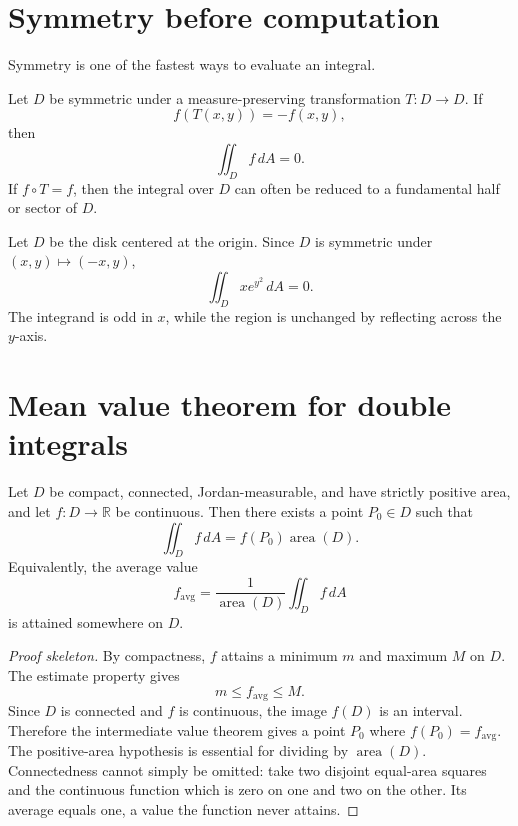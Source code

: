 \section{Symmetry before computation}

Symmetry is one of the fastest ways to evaluate an integral.

\begin{proposition}
Let \(D\) be symmetric under a measure-preserving transformation \(T:D\to D\).  If
\[
  f(T(x,y))=-f(x,y),
\]
then
\[
  \iint_D f\,dA=0.
\]
If \(f\circ T=f\), then the integral over \(D\) can often be reduced to a fundamental half or sector of \(D\).
\end{proposition}

\begin{example}
Let \(D\) be the disk centered at the origin.  Since \(D\) is symmetric under \((x,y)\mapsto(-x,y)\),
\[
  \iint_D x e^{y^2}\,dA=0.
\]
The integrand is odd in \(x\), while the region is unchanged by reflecting across the \(y\)-axis.
\end{example}

\section{Mean value theorem for double integrals}

\begin{theorem}
Let \(D\) be compact, connected, Jordan-measurable, and have strictly positive area, and let \(f:D\to\mathbb R\) be continuous.  Then there exists a point \(P_0\in D\) such that
\[
  \iint_D f\,dA=f(P_0)\operatorname{area}(D).
\]
Equivalently, the average value
\[
  f_{\mathrm{avg}}=\frac{1}{\operatorname{area}(D)}\iint_D f\,dA
\]
is attained somewhere on \(D\).
\end{theorem}

\begin{proof}[Proof skeleton]
By compactness, \(f\) attains a minimum \(m\) and maximum \(M\) on \(D\).  The estimate property gives
\[
  m\le f_{\mathrm{avg}}\le M.
\]
Since \(D\) is connected and \(f\) is continuous, the image \(f(D)\) is an interval. Therefore the intermediate value theorem gives a point \(P_0\) where \(f(P_0)=f_{\mathrm{avg}}\). The positive-area hypothesis is essential for dividing by \(\operatorname{area}(D)\). Connectedness cannot simply be omitted: take two disjoint equal-area squares and the continuous function which is zero on one and two on the other. Its average equals one, a value the function never attains.
\end{proof}

